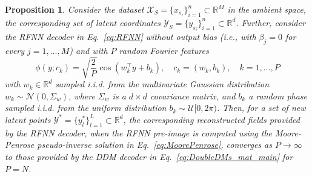 \documentclass{article}
\newtheorem{prop}{Proposition}
\begin{document}
\begin{prop}
Consider the dataset $\mathcal{X}_S=\{ x_{s_i}\}_{i=1}^n\subset\mathbb{R}^M$ in the ambient space, the corresponding set of latent coordinates $\mathcal{Y}_S=\{ y_{s_i}\}_{i=1}^n\subset\mathbb{R}^d$. Further, consider the RFNN decoder in Eq.~\eqref{eq:RFNN} without output bias (i.e., with $\beta_j=0$ for every $j=1,\ldots,M$) and with $P$ random Fourier features
\begin{equation}
\phi(y;c_k) = \sqrt{\frac{2}{P}}\cos(w_k^\top y + b_k), \quad c_k=(w_k,b_k), \quad k=1,\ldots,P
\label{eq:fourierrand}
\end{equation}
with $w_k \in \mathbb{R}^d$ sampled i.i.d. from the multivariate Gaussian distribution $w_k\sim \mathcal{N}(0,\Sigma_w)$, where $\Sigma_w$ is a $d\times d$ covariance matrix, and $b_k$ a random phase sampled i.i.d. from the uniform distribution $b_k\sim \mathcal{U}[0,2\pi)$. Then, for a set of new latent points $\mathcal{Y}^*=\{ y_l^*\}_{l=1}^L\subset\mathbb{R}^d$, the corresponding reconstructed fields provided by the RFNN decoder, when the RFNN pre-image is computed using the Moore-Penrose pseudo-inverse solution in Eq.~\eqref{eq:MoorePenrose}, converges as $P\to \infty$ to those provided by the DDM decoder in Eq.~\eqref{eq:DoubleDMs_mat_main} for $P=N$. %
\end{prop}
\end{document}
